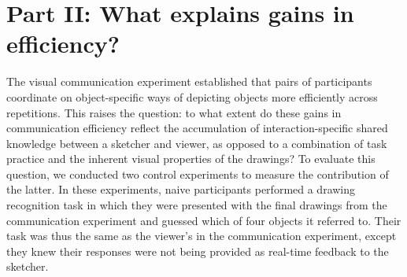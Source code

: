 \documentclass[10pt,letterpaper]{article}
\begin{document}







\section{Part II: What explains gains in efficiency?}

The visual communication experiment established that pairs of participants coordinate on object-specific ways of depicting objects more efficiently across repetitions.  
This raises the question: to what extent do these gains in communication efficiency reflect the accumulation of interaction-specific shared knowledge between a sketcher and viewer, as opposed to a combination of task practice and the inherent visual properties of the drawings? 
To evaluate this question, we conducted two control experiments to measure the contribution of the latter. 
In these experiments, naive participants performed a drawing recognition task in which they were presented with the final drawings from the communication experiment and guessed which of four objects it referred to. 
Their task was thus the same as the viewer's in the communication experiment, except they knew their responses were not being provided as real-time feedback to the sketcher.
\end{document}
